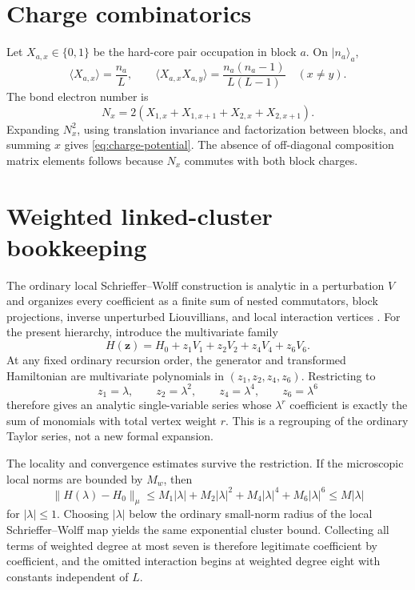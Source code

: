 \documentclass[11pt]{article}
\theoremstyle{definition}
\theoremstyle{remark}
\newcommand{\ket}[1]{\lvert #1\rangle}
\newcommand{\norm}[1]{\lVert #1\rVert}
\begin{document}
\section{Charge combinatorics}
\label{app:charge}

Let $X_{a,x}\in\{0,1\}$ be the hard-core pair occupation in block $a$.  On $\ket{n_a}_a$,
\begin{equation}
 \langle X_{a,x}\rangle=\frac{n_a}{L},
 \qquad
 \langle X_{a,x}X_{a,y}\rangle=\frac{n_a(n_a-1)}{L(L-1)}
 \quad(x\ne y).
\end{equation}
The bond electron number is
\begin{equation}
 N_x=2(X_{1,x}+X_{1,x+1}+X_{2,x}+X_{2,x+1}).
\end{equation}
Expanding $N_x^2$, using translation invariance and factorization between blocks, and summing $x$ gives \eqref{eq:charge-potential}.  The absence of off-diagonal composition matrix elements follows because $N_x$ commutes with both block charges.

\section{Weighted linked-cluster bookkeeping}
\label{app:weighted}

The ordinary local Schrieffer--Wolff construction is analytic in a perturbation $V$ and organizes every coefficient as a finite sum of nested commutators, block projections, inverse unperturbed Liouvillians, and local interaction vertices \cite{Bravyi2011}.  For the present hierarchy, introduce the multivariate family
\begin{equation}
 H(\mathbf z)=H_0+z_1V_1+z_2V_2+z_4V_4+z_6V_6.
 \label{eq:multivariate-SW}
\end{equation}
At any fixed ordinary recursion order, the generator and transformed Hamiltonian are multivariate polynomials in $(z_1,z_2,z_4,z_6)$.  Restricting to
\begin{equation}
 z_1=\lambda,
 \qquad z_2=\lambda^2,
 \qquad z_4=\lambda^4,
 \qquad z_6=\lambda^6
\end{equation}
therefore gives an analytic single-variable series whose $\lambda^r$ coefficient is exactly the sum of monomials with total vertex weight $r$.  This is a regrouping of the ordinary Taylor series, not a new formal expansion.

The locality and convergence estimates survive the restriction.  If the microscopic local norms are bounded by $M_w$, then
\begin{equation}
 \norm{H(\lambda)-H_0}_\mu
 \le M_1|\lambda|+M_2|\lambda|^2+M_4|\lambda|^4+M_6|\lambda|^6
 \le M|\lambda|
\end{equation}
for $|\lambda|\le1$.  Choosing $|\lambda|$ below the ordinary small-norm radius of the local Schrieffer--Wolff map yields the same exponential cluster bound.  Collecting all terms of weighted degree at most seven is therefore legitimate coefficient by coefficient, and the omitted interaction begins at weighted degree eight with constants independent of $L$.
\end{document}
